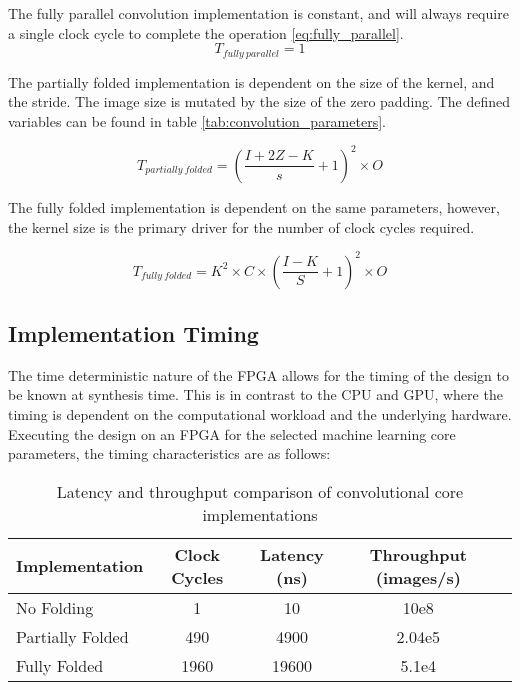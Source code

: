 The fully parallel convolution implementation is constant, and will always require a single clock cycle to complete the operation \ref{eq:fully_parallel}.
\begin{equation}
    T_{fully\ parallel} = 1 \label{eq:fully_parallel}
\end{equation}

The partially folded implementation is dependent on the size of the kernel, and the stride. 
The image size is mutated by the size of the zero padding.
The defined variables can be found in table \ref{tab:convolution_parameters}.

\begin{equation}
    T_{partially\ folded} = \left( \frac{I + 2Z - K}{s} + 1 \right)^2 \times O
\end{equation}

The fully folded implementation is dependent on the same parameters, however, the kernel size is the primary driver for the number of clock cycles required.

\begin{equation}
    T_{fully\ folded} = K^2 \times C \times \left( \frac{I - K}{S} + 1 \right)^2 \times O
\end{equation}

\subsection{Implementation Timing}
The time deterministic nature of the FPGA allows for the timing of the design to be known at synthesis time.
This is in contrast to the CPU and GPU, where the timing is dependent on the computational workload and the underlying hardware.
Executing the design on an FPGA for the selected machine learning core parameters, the timing characteristics are as follows:

\begin{table}[h!]
    \centering
    \caption{Latency and throughput comparison of convolutional core implementations}
    \label{tab:latency_comparison}
    \begin{tabular}{lcccc}
        \toprule
        Implementation & Clock Cycles & Latency (ns) & Throughput (images/s) \\
        \midrule
        No Folding & 1 & 10 & 10e8 \\
        Partially Folded & 490 & 4900 & 2.04e5 \\
        Fully Folded & 1960 & 19600 & 5.1e4 \\
        \bottomrule
    \end{tabular}
\end{table}

